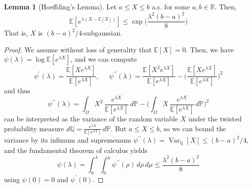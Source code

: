 \documentclass{article}
\DeclareMathOperator{\Var}{Var}
\theoremstyle{definition}
\newtheorem{lemma}[theorem]{Lemma}
\theoremstyle{remark}
\theoremstyle{definition}
\begin{document}
\begin{lemma}[Hoeffding's Lemma]
Let $a \leq X \leq b$ a.s. for some $a, b \in \mathbb{R}$. Then, 
\[\mathbb{E}[e^{\lambda(X - \mathbb{E}[X])}] \leq \exp \bigg( \frac{\lambda^2 (b - a)^2}{8} \bigg)\]
That is, $X$ is $(b-a)^2 /4$-subgaussian. 
\end{lemma}
\begin{proof}
We assume without loss of generality that $\mathbb{E}[X] = 0$. Then, we have $\psi(\lambda) = \log \mathbb{E}[ e^{\lambda X}]$, and we can compute 
\[\psi^\prime (\lambda) = \frac{\mathbb{E}[X e^{\lambda X}]}{\mathbb{E}[e^{\lambda X}]}, \;\;\;\;\; \psi^{\prime\prime} (\lambda) = \frac{\mathbb{E}[X^2 e^{\lambda X}]}{\mathbb{E}[e^{\lambda X}]} - \bigg( \frac{\mathbb{E}[X e^{\lambda X}]}{\mathbb{E}[e^{\lambda X}]} \bigg)^2\]
and thus 
\[\psi^{\prime\prime} (\lambda) = \int_\Omega X^2 \, \frac{e^{\lambda X}}{\mathbb{E}[e^{\lambda X}]} \,d\mathbb{P} - \bigg( \int_\Omega X \, \frac{e^{\lambda X}}{\mathbb{E}[e^{\lambda X}]} \,d\mathbb{P} \bigg)^2 \] 
can be interpreted as the variance of the random variable $X$ under the twisted probability measure $d\mathbb{Q} = \frac{e^{\lambda X}}{\mathbb{E}[e^{\lambda X}]} \,d\mathbb{P}$. But $a \leq X \leq b$, so we can bound the variance by its infimum and suprememum $\psi^{\prime\prime} (\lambda) = \Var_\mathbb{Q} [X] \leq (b-a)^2 / 4$, and the fundamental theorem of calculus yields 
\[\psi(\lambda) = \int_0^\lambda \int_0^\mu \psi^{\prime\prime} (\rho) \, d\rho \, d\mu \leq \frac{\lambda^2 (b - a)^2}{8}\]
using $\psi(0) = 0$ and $\psi^\prime (0)$. 
\end{proof}
\end{document}
